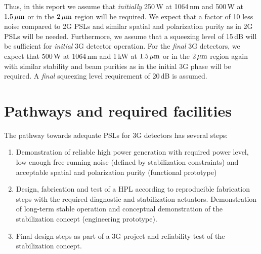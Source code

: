 Thus, in this report we assume that \emph{initially} 250\,W at 1064\,nm and 500\,W at  $ 1.5\, {\rm \mu m}$ or in the $ 2\, {\rm \mu m}$ region will be required. We expect that a factor of 10 less noise compared to 2G PSLs and similar spatial and polarization purity as in 2G PSLs will be needed. Furthermore, we assume that a squeezing level of 15\,dB will be sufficient for \emph{initial} 3G detector operation. For the \emph{final} 3G detectors, we expect that  500\,W at 1064\,nm and 1\,kW at  $ 1.5\, {\rm \mu m}$ or in the $ 2\, {\rm \mu m}$ region again with similar stability and beam purities as in the initial 3G phase will be required. A \emph{final} squeezing level requirement of 20\,dB is assumed.

%


\section{Pathways and required facilities} \label{sec:pathway}
The pathway towards adequate PSLs for 3G detectors has several steps:
\begin{enumerate}
	\item Demonstration of reliable high power generation with required power level, low enough free-running noise (defined by stabilization constraints) and acceptable spatial and polarization purity (functional prototype)
	\item Design, fabrication and test of a HPL according to reproducible fabrication steps with the required diagnostic and stabilization actuators. Demonstration of long-term stable operation and conceptual demonstration of the stabilization concept (engineering prototype).
	\item Final design steps as part of a 3G project and reliability test of the stabilization concept.
\end{enumerate}

